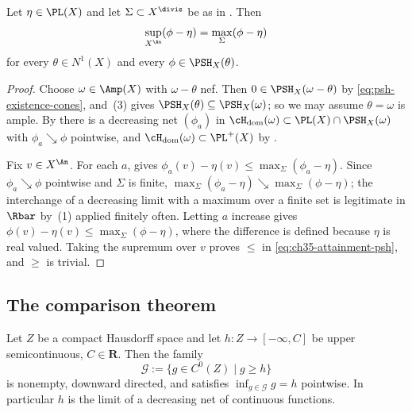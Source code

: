 \begin{lemma}
\label{lem:ch35-attainment-psh}
Let $\eta\in\PL(X)$ and let $\Sigma\subset X^{\divis}$ be as in
.  Then
\begin{equation}
\label{eq:ch35-attainment-psh}
 \sup_{X^{\An}}(\phi-\eta)=\max_\Sigma(\phi-\eta)
\end{equation}
for every $\theta\in N^1(X)$ and every $\phi\in\PSH_X(\theta)$.
\end{lemma}

\begin{proof}
Choose $\omega\in\Amp(X)$ with $\omega-\theta$ nef.  Then
$0\in\PSH_X(\omega-\theta)$ by \eqref{eq:psh-existence-cones}, and
\,(3) gives
$\PSH_X(\theta)\subseteq\PSH_X(\omega)$; so we may assume
$\theta=\omega$ is ample.  By \cite[Theorem~4.15\,(iii)]{BJ22} there is a
decreasing net $(\phi_a)$ in
$\cH_{\mathrm{dom}}(\omega)\subset\PL(X)\cap\PSH_X(\omega)$ with
$\phi_a\searrow\phi$ pointwise, and
$\cH_{\mathrm{dom}}(\omega)\subset\PL^+(X)$ by
\cite[(3.2)]{BJ22}.

Fix $v\in X^{\An}$.  For each $a$,
 gives
$\phi_a(v)-\eta(v)\leq\max_\Sigma(\phi_a-\eta)$.  Since
$\phi_a\searrow\phi$ pointwise and $\Sigma$ is finite,
$\max_\Sigma(\phi_a-\eta)\searrow\max_\Sigma(\phi-\eta)$; the interchange
of a decreasing limit with a maximum over a finite set is legitimate in
$\Rbar$ by \,(1) applied finitely often.
Letting $a$ increase gives
$\phi(v)-\eta(v)\leq\max_\Sigma(\phi-\eta)$, where the difference is
defined because $\eta$ is real valued.  Taking the supremum over
$v$ proves $\leq$ in \eqref{eq:ch35-attainment-psh}, and $\geq$ is
trivial.
\end{proof}

\subsection{The comparison theorem}
\label{sec:ch35-comparison}

\begin{lemma}
\label{lem:ch35-usc-inf-continuous}
Let $Z$ be a compact Hausdorff space and let
$h:Z\to[-\infty,C]$ be upper semicontinuous, $C\in\mathbf R$.  Then the
family
\[
 \mathcal G:=\{g\in C^0(Z)\mid g\geq h\}
\]
is nonempty, downward directed, and satisfies
$\inf_{g\in\mathcal G}g=h$ pointwise.  In particular $h$ is the limit of
a decreasing net of continuous functions.
\end{lemma}

